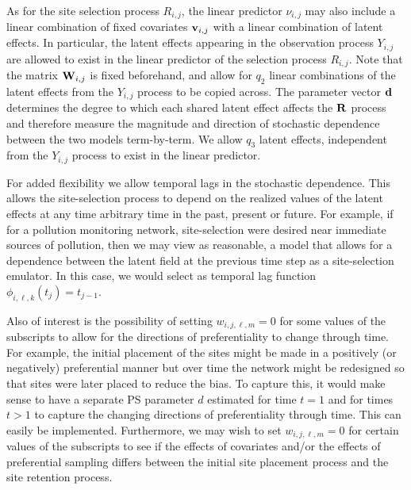 As for the site selection process $R_{i, j}$, the linear predictor $\nu_{i, j}$ may also include 
a linear combination of fixed covariates $\mathbf{v}_{i, j}$ with a linear combination of latent effects.
In particular, the latent effects appearing in the observation process $Y_{i, j}$ are allowed to exist
in the linear predictor of the selection process $R_{i, j}$. Note that the matrix $\mathbf{W}_{i, j}$ is fixed
beforehand, and allow for $q_2$ linear combinations of the latent effects from the $Y_{i, j}$ 
process to be copied across. The parameter vector $\mathbf{d}$ determines the degree to which each shared
latent effect affects the $\mathbf{R}$ process and therefore measure the magnitude and direction of stochastic
dependence between the two models term-by-term. We allow $q_3$ latent effects, independent 
from the $Y_{i, j}$ process to exist in the linear predictor.

For added flexibility we allow temporal lags in the stochastic dependence. This allows the 
site-selection process to depend on the realized values of the latent effects at any time arbitrary 
time in the past, present or future. For example, if for a pollution monitoring network, 
site-selection were desired near immediate sources of pollution, then we may view as reasonable, 
a model that allows for a dependence between the latent field at the previous time step 
as a site-selection emulator. In this case, we would select as temporal lag function 
$\phi_{i, \ell, k}(t_j) = t_{j-1}$. 

Also of interest is the possibility of setting $w_{i,j,\ell,m} = 0$ for some values of the subscripts
to allow for the directions of preferentiality to change through time. For example, 
the initial placement of the sites might be made in a positively (or negatively) preferential manner
but over time the network might be redesigned so that sites were later placed to reduce the bias. 
To capture this, it would make sense to have a separate PS parameter $d$ estimated for time $t = 1$
and for times $t > 1$ to capture the changing directions of preferentiality through time. 
This can easily be implemented. Furthermore, we may wish to set $w_{i,j,\ell,m} = 0$ for certain 
values of the subscripts to see if the effects of covariates and/or the effects of preferential sampling 
differs between the initial site placement process and the site retention process.

